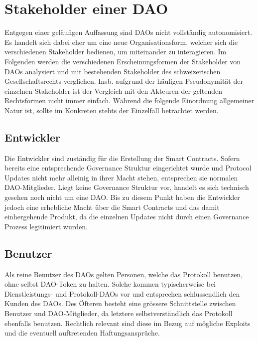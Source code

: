 \documentclass[a4paper,12pt]{report}
\begin{document}
	\section{Stakeholder einer DAO}
	\startsection
    Entgegen einer geläufigen Auffassung sind DAOs nicht vollständig autonomisiert. Es handelt sich dabei eher um eine neue Organisationsform, welcher sich die verschiedenen Stakeholder bedienen, um miteinander zu interagieren. Im Folgenden werden die verschiedenen Erscheinungsformen der Stakeholder von DAOs analysiert und mit bestehenden Stakeholder des schweizerischen Gesellschaftsrechts verglichen. Insb. aufgrund der häufigen Pseudonymität der einzelnen Stakeholder ist der Vergleich mit den Akteuren der geltenden Rechtsformen nicht immer einfach. Während die folgende Einordnung allgemeiner Natur ist, sollte im Konkreten stehts der Einzelfall betrachtet werden.
    
	\subsection{Entwickler}
	\startsubsection
	Die Entwickler sind zuständig für die Erstellung der Smart Contracts. Sofern bereits eine entsprechende Governance Struktur eingerichtet wurde und Protocol Updates nicht mehr alleinig in ihrer Macht stehen, entsprechen sie normalen DAO-Mitglieder. Liegt keine Governance Struktur vor, handelt es sich technisch gesehen noch nicht um eine DAO. Bis zu diesem Punkt haben die Entwickler jedoch eine erhebliche Macht über die Smart Contracts und das damit einhergehende Produkt, da die einzelnen Updates nicht durch einen Governance Prozess legitimiert wurden.
	\closesection
	
	\subsection{Benutzer}
	\startsubsection
	Als reine Benutzer des DAOs gelten Personen, welche das Protokoll benutzen, ohne selbst DAO-Token zu halten. Solche kommen typischerweise bei Dienstleistungs- und Protokoll-DAOs vor und entsprechen schlussendlich den Kunden des DAOs. Des Öfteren besteht eine grössere Schnittstelle zwischen Benutzer und DAO-Mitglieder, da letztere selbstverständlich das Protokoll ebenfalls benutzen. Rechtlich relevant sind diese im Bezug auf mögliche Exploits und die eventuell auftretenden Haftungsansprüche.
	\closesection
	
\end{document}
